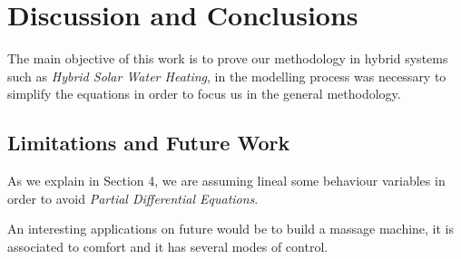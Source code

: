 \chapter{Discussion and Conclusions}
\label{ch:conclusions}
The main objective of this work is to prove our methodology in hybrid 
systems such as \emph{Hybrid Solar Water Heating}, in the modelling 
process was necessary to simplify the equations in order to focus us 
in the general methodology. 

\section{Limitations and Future Work}
\label{sec:limitations}

As we explain in Section 4, we are assuming lineal some behaviour
variables in order to avoid \emph{Partial Differential Equations}.

An interesting applications on future would be  to build a massage 
machine, it is associated to comfort and it has several modes of 
control.

